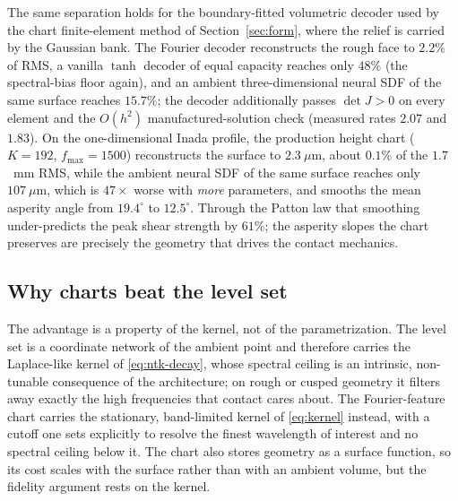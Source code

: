 The same separation holds for the boundary-fitted volumetric decoder used by the chart finite-element
method of Section~\ref{sec:form}, where the relief is carried by the Gaussian bank. The Fourier
decoder reconstructs the rough face to $2.2\%$ of RMS, a vanilla $\tanh$ decoder of equal capacity reaches
only $48\%$ (the spectral-bias floor again), and an ambient three-dimensional neural SDF of the same surface
reaches $15.7\%$; the decoder additionally passes $\det J>0$ on every element and the $O(h^2)$
manufactured-solution check (measured rates $2.07$ and $1.83$). On the one-dimensional Inada profile, the
production height chart ($K=192$, $f_{\max}=1500$) reconstructs the surface to $2.3~\mu\mathrm{m}$, about
$0.1\%$ of the $1.7$~mm RMS, while the ambient neural SDF of the same surface reaches only
$107~\mu\mathrm{m}$, which is $47\times$ worse with \emph{more} parameters, and smooths the mean asperity
angle from $19.4^\circ$ to $12.5^\circ$. Through the Patton law that smoothing under-predicts the peak shear
strength by $61\%$; the asperity slopes the chart preserves are precisely the geometry that drives the
contact mechanics.

\subsection{Why charts beat the level set}\label{sec:why}

The advantage is a property of the kernel, not of the parametrization. The level set is a coordinate
network of the ambient point and therefore carries the Laplace-like kernel of \eqref{eq:ntk-decay}, whose
spectral ceiling is an intrinsic, non-tunable consequence of the architecture; on rough or cusped geometry
it filters away exactly the high frequencies that contact cares about. The Fourier-feature chart carries
the stationary, band-limited kernel of \eqref{eq:kernel} instead, with a cutoff one sets explicitly to
resolve the finest wavelength of interest and no spectral ceiling below it. The chart also stores geometry
as a surface function, so its cost scales with the surface rather than with an ambient volume, but the
fidelity argument rests on the kernel.

